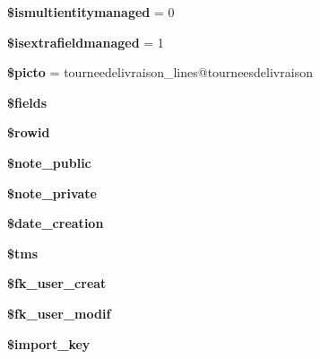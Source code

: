 \begin{DoxyCompactItemize}
{\bfseries \$ismultientitymanaged} = 0
\item 
\mbox{\label{classTourneeDeLivraison__lines_a685ad5f950fe23311cb1efafbb18e42b}} 
{\bfseries \$isextrafieldmanaged} = 1
\item 
\mbox{\label{classTourneeDeLivraison__lines_a490cc7ffc62ff37a855c4940315d24ab}} 
{\bfseries \$picto} = \textquotesingle{}tourneedelivraison\+\_\+lines@tourneesdelivraison\textquotesingle{}
\item 
{\bfseries \$fields}
\item 
\mbox{\label{classTourneeDeLivraison__lines_a50e62ae4d87108117855b333595d5a38}} 
{\bfseries \$rowid}
\item 
\mbox{\label{classTourneeDeLivraison__lines_a78e1e6a730cbcb0bc6f78f2709ad6c67}} 
{\bfseries \$note\+\_\+public}
\item 
\mbox{\label{classTourneeDeLivraison__lines_ac2b52fa05b6f85976070fcae6c43e961}} 
{\bfseries \$note\+\_\+private}
\item 
\mbox{\label{classTourneeDeLivraison__lines_ad3d8ffa720a81ceb0c7a2705fbe23b43}} 
{\bfseries \$date\+\_\+creation}
\item 
\mbox{\label{classTourneeDeLivraison__lines_a7b49d57bd209c4ab4cf51a8eac4e8d02}} 
{\bfseries \$tms}
\item 
\mbox{\label{classTourneeDeLivraison__lines_a6944e0664a13c4f74854209abd1397e0}} 
{\bfseries \$fk\+\_\+user\+\_\+creat}
\item 
\mbox{\label{classTourneeDeLivraison__lines_acc2982f0e5bca7f5c6244c366dc3513c}} 
{\bfseries \$fk\+\_\+user\+\_\+modif}
\item 
\mbox{\label{classTourneeDeLivraison__lines_a7ec449c311c701ab77a1e104088b921b}} 
{\bfseries \$import\+\_\+key}
\item 

\end{DoxyCompactItemize}
